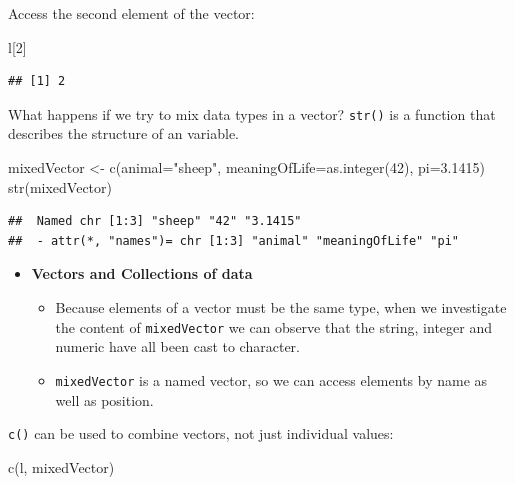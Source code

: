 \documentclass[a4paper]{book}
\newenvironment{Shaded}{}{}
\newcommand{\KeywordTok}[1]{\textcolor[rgb]{0.00,0.00,1.00}{{#1}}}
\newcommand{\DataTypeTok}[1]{{#1}}
\newcommand{\DecValTok}[1]{{#1}}
\newcommand{\FloatTok}[1]{{#1}}
\newcommand{\StringTok}[1]{\textcolor[rgb]{0.00,0.50,0.50}{{#1}}}
\newcommand{\NormalTok}[1]{{#1}}
\providecommand{\tightlist}{%
  \setlength{\itemsep}{0pt}\setlength{\parskip}{0pt}}
\newlength{\leftbarwidth}
\newlength{\leftbarsep}
\newcommand*{\leftbarcolorcmd}{\color{darkgray}}%
\renewenvironment{leftbar}{%
    \def\FrameCommand{{\leftbarcolorcmd{\vrule width \leftbarwidth\relax\hspace {\leftbarsep}}}}%
    \MakeFramed {\advance \hsize -\width \FrameRestore }%
}{%
    \endMakeFramed
}
\renewenvironment{Shaded}
{\vspace{0em}\begin{leftbar}\begin{snugshade}}
{\end{snugshade}\end{leftbar}\vspace{0pt}}
\newenvironment{rmdblock}[1]
  {\vspace{1.5em}\begin{shaded*}
  \begin{itemize}
  \renewcommand{\labelitemi}{
    \raisebox{-.7\height}[0pt][0pt]{
      {\setkeys{Gin}{width=3em,keepaspectratio}\texttt{[image: images/\#1]}}
    }
  }
  \item
  }
  {
  \end{itemize}
  \end{shaded*}
  }
\newenvironment{rmdtip}
  {\begin{rmdblock}{tip}}
  {\end{rmdblock}}
\begin{document}
Access the second element of the vector:

\begin{Shaded}
\begin{Highlighting}[]
\NormalTok{l[}\DecValTok{2}\NormalTok{]}
\end{Highlighting}
\end{Shaded}

\begin{verbatim}
## [1] 2
\end{verbatim}

What happens if we try to mix data types in a vector? \texttt{str()} is
a function that describes the structure of an variable.

\begin{Shaded}
\begin{Highlighting}[]
\NormalTok{mixedVector <-}\StringTok{ }\KeywordTok{c}\NormalTok{(}\DataTypeTok{animal=}\StringTok{"sheep"}\NormalTok{, }\DataTypeTok{meaningOfLife=}\KeywordTok{as.integer}\NormalTok{(}\DecValTok{42}\NormalTok{), }\DataTypeTok{pi=}\FloatTok{3.1415}\NormalTok{)}
\KeywordTok{str}\NormalTok{(mixedVector)}
\end{Highlighting}
\end{Shaded}

\begin{verbatim}
##  Named chr [1:3] "sheep" "42" "3.1415"
##  - attr(*, "names")= chr [1:3] "animal" "meaningOfLife" "pi"
\end{verbatim}

\begin{rmdtip}
\textbf{Vectors and Collections of data}

\begin{itemize}
\tightlist
\item
  Because elements of a vector must be the same type, when we
  investigate the content of \texttt{mixedVector} we can observe that
  the string, integer and numeric have all been cast to character.
\item
  \texttt{mixedVector} is a named vector, so we can access elements by
  name as well as position.
\end{itemize}
\end{rmdtip}

\texttt{c()} can be used to combine vectors, not just individual values:

\begin{Shaded}
\begin{Highlighting}[]
\KeywordTok{c}\NormalTok{(l, mixedVector)}
\end{Highlighting}
\end{Shaded}
\end{document}
